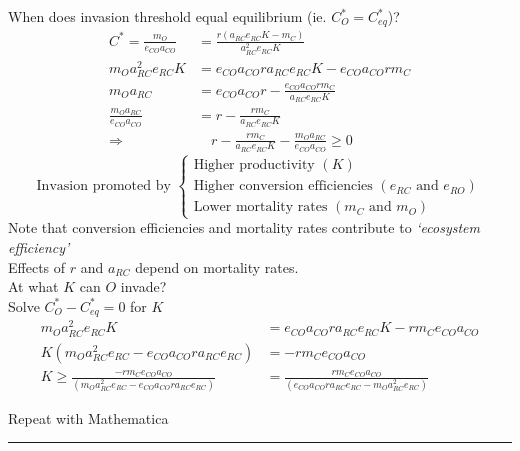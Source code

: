 \documentclass{article}
\newcommand{\note}[1]{\colorbox{gray!30}{#1}}
\newcommand{\ind}{\-\hspace{1cm}}
\newcommand*\circled[1]{\tikz[baseline=(char.base)]{
            \node[shape=circle,draw,inner sep=2pt] (char) {#1};}}
\begin{document}
\ind When does invasion threshold equal equilibrium (ie. $C_O^* = C_{eq}^*$)?
\begin{align*}
	C^* = \frac{m_O}{e_{CO}a_{CO}} &= \frac{r(a_{RC}e_{RC}K-m_C)}{a_{RC}^2 e_{RC} K}\\
	m_O a_{RC}^2 e_{RC} K &= e_{CO} a_{CO} r a_{RC} e_{RC} K - e_{CO} a_{CO} r m_C\\
	m_O a_{RC}  & = e_{CO} a_{CO} r - \frac{e_{CO} a_{CO} r m_C}{a_{RC}e_{RC} K}\\
	\frac{m_O a_{RC}}{e_{CO} a_{CO}}  & = r - \frac{ r m_C}{a_{RC}e_{RC} K}\\
	\Rightarrow & \quad   r - \frac{ r m_C}{a_{RC}e_{RC} K} - \frac{m_O a_{RC}}{e_{CO} a_{CO}}  \geq 0
\end{align*}
\begin{equation*}
\text{Invasion promoted by }\begin{cases}
\text{Higher productivity }(K)\\
\text{Higher conversion efficiencies }(e_{RC} \text{ and } e_{RO})\\
\text{Lower mortality rates }(m_C \text{ and } m_O)
\end{cases}
\end{equation*}
\ind \ind Note that conversion efficiencies and mortality rates contribute to \emph{`ecosystem efficiency'}\\
\ind \ind Effects of $r$ and $a_{RC}$ depend on mortality rates.\\

\circled{4b}At what $K$ can $O$ invade?\\
\ind Solve $C_O^* - C_{eq}^* = 0$ for $K$
\begin{align*}
	m_O a_{RC}^2 e_{RC} K &= e_{CO} a_{CO} r a_{RC} e_{RC} K - r m_C e_{CO} a_{CO} \\
	K(m_O a_{RC}^2 e_{RC}-e_{CO} a_{CO} r a_{RC} e_{RC}) & =  - r m_C e_{CO} a_{CO} \\
	K  \geq   \frac{- r m_C e_{CO} a_{CO}}{(m_O a_{RC}^2 e_{RC}-e_{CO} a_{CO} r a_{RC} e_{RC})} & =  \frac{r m_C e_{CO} a_{CO}}{(e_{CO} a_{CO} r a_{RC} e_{RC}-m_O a_{RC}^2 e_{RC})}
\end{align*}

\note{Repeat with Mathematica}


\rule[0.5ex]{\linewidth}{1pt}
\end{document}
